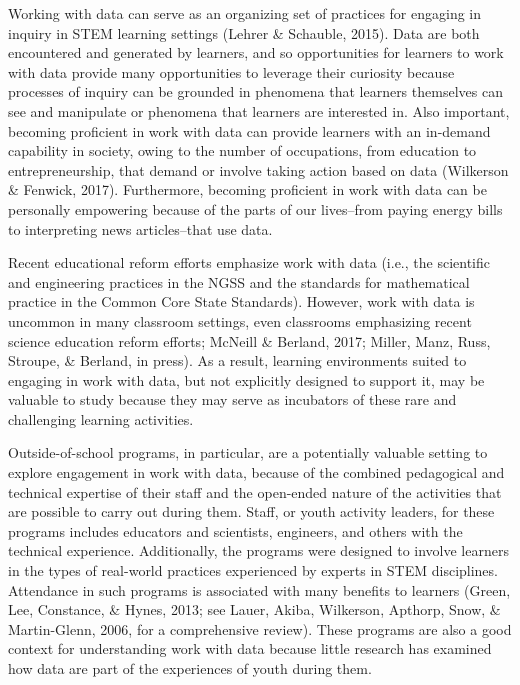 \documentclass[]{msu-thesis}
\theoremstyle{definition}
\theoremstyle{definition}
\theoremstyle{definition}
\theoremstyle{remark}
\begin{document}
Working with data can serve as an organizing set of practices for
engaging in inquiry in STEM learning settings (Lehrer \& Schauble,
2015). Data are both encountered and generated by learners, and so
opportunities for learners to work with data provide many opportunities
to leverage their curiosity because processes of inquiry can be grounded
in phenomena that learners themselves can see and manipulate or
phenomena that learners are interested in. Also important, becoming
proficient in work with data can provide learners with an in-demand
capability in society, owing to the number of occupations, from
education to entrepreneurship, that demand or involve taking action
based on data (Wilkerson \& Fenwick, 2017). Furthermore, becoming
proficient in work with data can be personally empowering because of the
parts of our lives--from paying energy bills to interpreting news
articles--that use data.

Recent educational reform efforts emphasize work with data (i.e., the
scientific and engineering practices in the NGSS and the standards for
mathematical practice in the Common Core State Standards). However, work
with data is uncommon in many classroom settings, even classrooms
emphasizing recent science education reform efforts; McNeill \& Berland,
2017; Miller, Manz, Russ, Stroupe, \& Berland, in press). As a result,
learning environments suited to engaging in work with data, but not
explicitly designed to support it, may be valuable to study because they
may serve as incubators of these rare and challenging learning
activities.

Outside-of-school programs, in particular, are a potentially valuable
setting to explore engagement in work with data, because of the combined
pedagogical and technical expertise of their staff and the open-ended
nature of the activities that are possible to carry out during them.
Staff, or youth activity leaders, for these programs includes educators
and scientists, engineers, and others with the technical experience.
Additionally, the programs were designed to involve learners in the
types of real-world practices experienced by experts in STEM
disciplines. Attendance in such programs is associated with many
benefits to learners (Green, Lee, Constance, \& Hynes, 2013; see Lauer,
Akiba, Wilkerson, Apthorp, Snow, \& Martin-Glenn, 2006, for a
comprehensive review). These programs are also a good context for
understanding work with data because little research has examined how
data are part of the experiences of youth during them.
\end{document}
